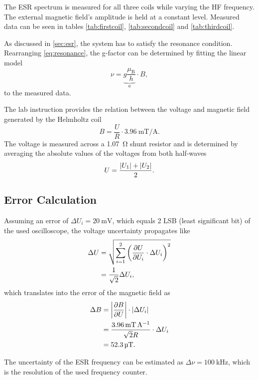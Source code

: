 The ESR spectrum is measured for all three coils while varying the HF frequency.
The external magnetic field's amplitude is held at a constant level.
Measured data can be seen in tables \ref{tab:firstcoil}, \ref{tab:secondcoil} and \ref{tab:thirdcoil}.

As discussed in \autoref{sec:esr}, the system has to satisfy the resonance condition.
Rearranging \autoref{eq:resonance}, the g-factor can be determined by fitting the linear model
\begin{equation}\label{eq:gfac}
	\nu=\underbrace{g\frac{\mu_\text{B}}{h}}_a \cdot B,
\end{equation}
to the measured data.

The lab instruction provides the relation between the voltage and magnetic field generated by the Helmholtz coil
\begin{equation}\label{eq:extfield}
	B=\frac{U}{R}\cdot\SI{3.96}{\milli\tesla\per\ampere}.
\end{equation}
The voltage is measured across a \SI{1.07}{\ohm} shunt resistor and is determined by averaging the absolute values of the voltages from both half-waves
\begin{equation*}
	U = \frac{\abs{U_1}+\abs{U_2}}{2}.
\end{equation*}

\subsection{Error Calculation}
Assuming an error of $\Delta U_i=\SI{20}{\mV}$, which equals 2 LSB (least significant bit) of the used oscilloscope, the voltage uncertainty propagates like
\begin{alignat*}{2}
	\Delta U &= \sqrt{\sum^2_{i=1}\left(\frac{\partial U}{\partial U_i}\cdot \Delta U_i\right)^2} \\
	&=\frac{1}{\sqrt{2}}\Delta U_i,
\end{alignat*}
which translates into the error of the magnetic field as
\begin{alignat*}{2}
	\Delta B &= \abs{\frac{\partial B}{\partial U}}\cdot \abs{\Delta U_i} \\
	&= \frac{\SI{3.96}{\milli\tesla\per\ampere}}{\sqrt{2}R}\cdot\Delta U_i \\
	&= \SI{52.3}{\micro\tesla}.
\end{alignat*}

The uncertainty of the ESR frequency can be estimated as $\Delta\nu = \SI{100}{\kHz}$, which is the resolution of the used frequency counter.

